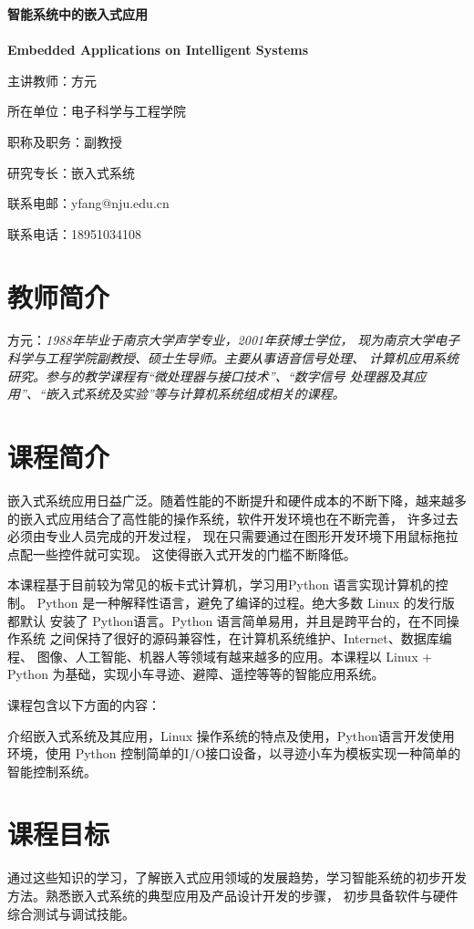 \documentclass{article}
\begin{document}
\begin{center}
\LARGE 
    \textbf{智能系统中的嵌入式应用}
 \ \\ \ \\
    \textbf{ Embedded Applications on Intelligent Systems}

\end{center}

\large
主讲教师：方元

所在单位：电子科学与工程学院

职称及职务：副教授

研究专长：嵌入式系统

联系电邮：yfang@nju.edu.cn

联系电话：18951034108

\normalsize
\section{教师简介}
  方元：\textit{1988年毕业于南京大学声学专业，2001年获博士学位，
  现为南京大学电子科学与工程学院副教授、硕士生导师。主要从事语音信号处理、
  计算机应用系统研究。参与的教学课程有``微处理器与接口技术''、``数字信号
  处理器及其应用''、``嵌入式系统及实验''等与计算机系统组成相关的课程。}

\section{课程简介}
   嵌入式系统应用日益广泛。随着性能的不断提升和硬件成本的不断下降，越来越多
   的嵌入式应用结合了高性能的操作系统，软件开发环境也在不断完善，
   许多过去必须由专业人员完成的开发过程，
   现在只需要通过在图形开发环境下用鼠标拖拉点配一些控件就可实现。
   这使得嵌入式开发的门槛不断降低。

   本课程基于目前较为常见的板卡式计算机，学习用Python 语言实现计算机的控制。
   Python 是一种解释性语言，避免了编译的过程。绝大多数 Linux 的发行版都默认
   安装了 Python语言。Python 语言简单易用，并且是跨平台的，在不同操作系统
   之间保持了很好的源码兼容性，在计算机系统维护、Internet、数据库编程、
   图像、人工智能、机器人等领域有越来越多的应用。本课程以 Linux + Python
   为基础，实现小车寻迹、避障、遥控等等的智能应用系统。

   课程包含以下方面的内容：
   
   介绍嵌入式系统及其应用，Linux 操作系统的特点及使用，Python语言开发使用
   环境，使用 Python 控制简单的I/O接口设备，以寻迹小车为模板实现一种简单的
   智能控制系统。

\section{课程目标}
  通过这些知识的学习，了解嵌入式应用领域的发展趋势，学习智能系统的初步开发
  方法。熟悉嵌入式系统的典型应用及产品设计开发的步骤，
    初步具备软件与硬件综合测试与调试技能。
\end{document}

